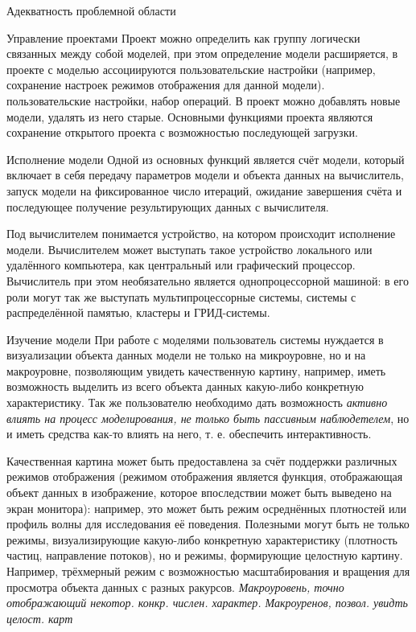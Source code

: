 \documentclass[a4paper,12pt]{extarticle}
\begin{document}
\begin{subsection}{Адекватность проблемной области}
\begin{subsubsection}{Управление проектами}
        Проект можно определить как группу логически связанных между собой моделей, при этом определение модели расширяется, в проекте с моделью ассоциируются пользовательские настройки (например, сохранение настроек режимов отображения для данной модели). пользовательские настройки, набор операций. В проект можно добавлять новые модели, удалять из него старые. Основными функциями проекта являются сохранение открытого проекта с возможностью последующей загрузки.
    \end{subsubsection}
        
    \begin{subsubsection}{Исполнение модели} 
        Одной из основных функций является счёт модели, который включает в себя передачу параметров модели и объекта данных на вычислитель, запуск модели на фиксированное число итераций, ожидание завершения счёта и последующее получение результирующих данных с вычислителя.
        
        Под вычислителем понимается устройство, на котором происходит исполнение модели. Вычислителем может выступать такое устройство локального или удалённого компьютера, как центральный или графический процессор. Вычислитель при этом необязательно является однопроцессорной машиной: в его роли могут так же выступать мультипроцессорные системы, системы с распределённой памятью, кластеры и ГРИД-системы.
    \end{subsubsection}
        
    \begin{subsubsection}{Изучение модели}
        При работе с моделями пользователь системы нуждается в  визуализации объекта данных модели не только на микроуровне, но и на макроуровне, позволяющим увидеть качественную картину, например, иметь возможность выделить из всего объекта данных какую-либо конкретную характеристику. Так же пользователю необходимо дать возможность \textit{активно влиять на процесс моделирования, не только быть пассивным наблюдетелем}, но и иметь средства как-то влиять на него, т. е. обеспечить интерактивность.
        
        Качественная картина может быть предоставлена за счёт поддержки различных режимов отображения (режимом отображения является функция, отображающая объект данных в изображение, которое впоследствии может быть выведено на экран монитора): например, это может быть режим осреднённых плотностей или профиль волны для исследования её поведения. Полезными могут быть не только режимы, визуализирующие какую-либо конкретную характеристику (плотность частиц, направление потоков), но и режимы, формирующие целостную картину. Например, трёхмерный режим с возможностью масштабирования и вращения для просмотра объекта данных с разных ракурсов.
        \textit{Макроуровень, точно отображающий некотор. конкр. числен. характер.
        Макроуренов, позвол. увидть целост. карт}
    \end{subsubsection}
        

\end{subsection}
\end{document}
